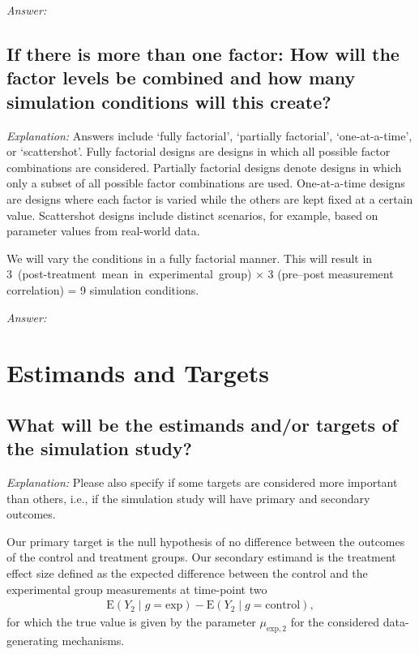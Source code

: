 \documentclass[12pt]{article}
\begin{document}
\textit{Answer:}

\subsection{If there is more than one factor: How will the factor levels be combined and how many simulation conditions will this create?}

\textit{Explanation:}  Answers include `fully factorial', `partially factorial', `one-at-a-time', or `scattershot'. Fully factorial designs are designs in which all possible factor combinations are considered. Partially factorial designs denote designs in which only a subset of all possible factor combinations are used. One-at-a-time designs are designs where each factor is varied while the others are kept fixed at a certain value. Scattershot designs include distinct scenarios, for example, based on parameter values from real-world data.

\begin{examplebox}
We will vary the conditions in a fully factorial manner. This will result in \mbox{3 (post-treatment mean in experimental group)} $\times$ 3 (pre--post measurement correlation) = 9 simulation conditions.
\end{examplebox}

\textit{Answer:}


\section{Estimands and Targets}
\subsection{What will be the estimands and/or targets of the simulation study?}

\textit{Explanation:} Please also specify if some targets are considered more important than others, i.e., if the simulation study will have primary and secondary outcomes.

\begin{examplebox}
Our primary target is the null hypothesis of no difference between the outcomes of the control and treatment groups. Our secondary estimand is the treatment effect size defined as the expected difference between the control and the experimental group measurements at time-point two
\begin{align*}
    \text{E}(Y_2 \mid g=\text{exp}) - \text{E}(Y_2 \mid g=\text{control}),
\end{align*}
for which the true value is given by the parameter $\mu_{\text{exp},2}$ for the considered data-generating mechanisms.
\end{examplebox}
\end{document}
